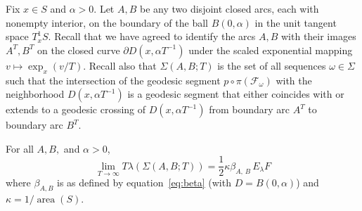 \documentclass[10pt]{amsart}
\theoremstyle{definition}\newtheorem{defi}[theo]{Definition}\newtheorem{rema}[theo]{Remark}\newtheorem{exam}[theo]{Example}\newtheorem{exem}[theo]{Example}\newtheorem{nota}[theo]{Notation}
\DeclareMathOperator{\area}{area}
\begin{document}
Fix $x\in S$ and $\alpha >0$. Let $A,B$ be any two disjoint closed arcs, each with nonempty interior, on the boundary of the ball $B (0,\alpha)$ in the unit tangent space $T^1_{x}S$. Recall that we have agreed to identify the arcs $A,B$ with their images $A^{T},B^{T}$ on the closed curve $\partial D(x, \alpha T^{-1})$ under the scaled exponential mapping $v\mapsto \exp _{x}(v/T)$. Recall also that $\Sigma(A,B;T)$ is the set of all sequences $\omega \in \Sigma$ such that the intersection of the geodesic segment $p\circ\pi (\mathcal{F}_{\omega})$ with the neighborhood $D(x, \alpha T^{-1})$ is a geodesic segment that either coincides with or extends to a geodesic crossing of $D(x, \alpha T^{-1})$ from boundary arc $A^{T}$ to boundary arc $B^{T}$.

\begin{prop}\label{proposition:measure-asymptotics}
For all $A,B,$ and $\alpha >0$,
\begin{equation}\label{eq:measure-asymptotics-again}
\lim_{T \rightarrow \infty} T\lambda (\Sigma (A,B;T))=
\frac{1}{2} \kappa \beta_{A,\,B}\,E_{\lambda}F
\end{equation}
where $\beta_{A,B}$ is as defined by equation~\eqref{eq:beta} (with $D=B(0, \alpha)$) and $\kappa=1/\area(S)$.
\end{prop}
\end{document}
